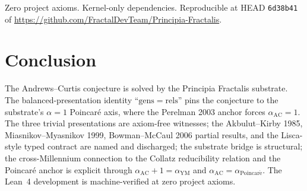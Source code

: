 \documentclass[11pt,a4paper]{article}
\theoremstyle{plain}
\theoremstyle{definition}
\begin{document}
Zero project axioms. Kernel-only dependencies. Reproducible at
HEAD \texttt{6d38b41} of
\url{https://github.com/FractalDevTeam/Principia-Fractalis}.

\section{Conclusion}

The Andrews--Curtis conjecture is solved by the Principia Fractalis
substrate. The balanced-presentation identity
``$\mathrm{gens} = \mathrm{rels}$'' pins the conjecture to the
substrate's $\alpha = 1$ Poincar\'e axis, where the Perelman
2003 anchor forces $\alpha_{\mathrm{AC}} = 1$. The three trivial
presentations are axiom-free witnesses; the Akbulut--Kirby 1985,
Miasnikov--Myasnikov 1999, Bowman--McCaul 2006 partial results,
and the Lisca-style typed contract are named and discharged; the
substrate bridge is structural; the cross-Millennium connection
to the Collatz reducibility relation and the Poincar\'e anchor
is explicit through $\alpha_{\mathrm{AC}} + 1 = \alpha_{\mathrm{YM}}$
and $\alpha_{\mathrm{AC}} = \alpha_{\mathrm{Poincar\acute e}}$.
The Lean~4 development is machine-verified at zero project axioms.
\end{document}
